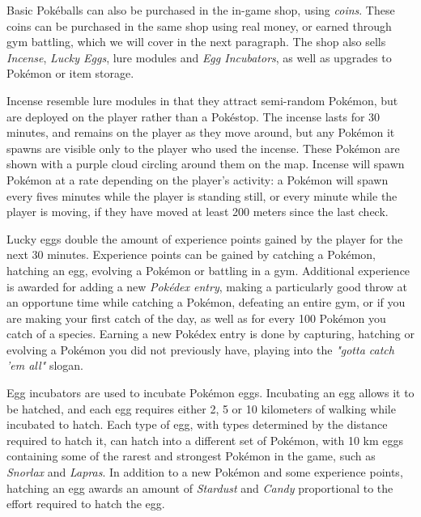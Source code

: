 Basic Pokéballs can also be purchased in the in-game shop, using \emph{coins}. These coins can be purchased in the same shop using real money, or earned through gym battling, which we will cover in the next paragraph. The shop also sells \emph{Incense}, \emph{Lucky Eggs}, lure modules and \emph{Egg Incubators}, as well as upgrades to Pokémon or item storage.

Incense resemble lure modules in that they attract semi-random Pokémon, but are deployed on the player rather than a Pokéstop. The incense lasts for 30 minutes, and remains on the player as they move around, but any Pokémon it spawns are visible only to the player who used the incense. These Pokémon are shown with a purple cloud circling around them on the map. Incense will spawn Pokémon at a rate depending on the player's activity: a Pokémon will spawn every fives minutes while the player is standing still, or every minute while the player is moving, if they have moved at least 200 meters since the last check.

Lucky eggs double the amount of experience points gained by the player for the next 30 minutes. Experience points can be gained by catching a Pokémon, hatching an egg, evolving a Pokémon or battling in a gym. Additional experience is awarded for adding a new \emph{Pokédex entry}, making a particularly good throw at an opportune time while catching a Pokémon, defeating an entire gym, or if you are making your first catch of the day, as well as for every 100 Pokémon you catch of a species. Earning a new Pokédex entry is done by capturing, hatching or evolving a Pokémon you did not previously have, playing into the \emph{"gotta catch 'em all"} slogan.

Egg incubators are used to incubate Pokémon eggs. Incubating an egg allows it to be hatched, and each egg requires either 2, 5 or 10 kilometers of walking while incubated to hatch. Each type of egg, with types determined by the distance required to hatch it, can hatch into a different set of Pokémon, with 10 km eggs containing some of the rarest and strongest Pokémon in the game, such as \emph{Snorlax} and \emph{Lapras}. In addition to a new Pokémon and some experience points, hatching an egg awards an amount of \emph{Stardust} and \emph{Candy} proportional to the effort required to hatch the egg.

